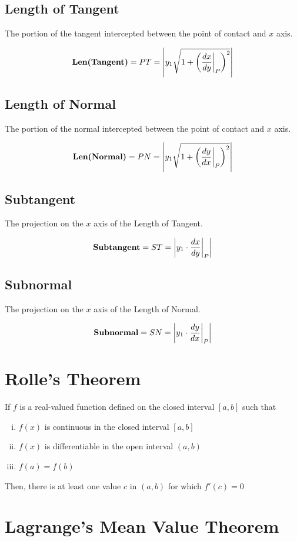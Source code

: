 \documentclass{article}
\begin{document}
\subsection{Length of Tangent}
The portion of the tangent intercepted between the point of contact and $x$ axis.

$$\textbf{Len(Tangent)}=PT=\abs{y_{1}\displaystyle\sqrt{1+\left(\dv{x}{y}\biggr\rvert_{P}\right)^2}}$$

\subsection{Length of Normal}
The portion of the normal intercepted between the point of contact and $x$ axis.

$$\textbf{Len(Normal)}=PN=\abs{y_{1}\displaystyle\sqrt{1+\left(\dv{y}{x} \biggr\rvert_{P}\right)^2}}$$

\subsection{Subtangent}
The projection on the $x$ axis of the Length of Tangent.

$$\textbf{Subtangent}=ST=\abs{y_{1}\cdot \dv{x}{y} \biggr\rvert_{P}}$$

\subsection{Subnormal}
The projection on the $x$ axis of the Length of Normal.

$$\textbf{Subnormal}=SN=\abs{y_{1}\cdot \dv{y}{x} \biggr\rvert_{P}}$$

\section{Rolle's Theorem}
If $f$ is a real-valued function defined on the closed interval $[a,b]$ such that \begin{enumerate}[i.]
    \item $f(x)$ is continuous in the closed interval $[a,b]$
    \item $f(x)$ is differentiable in the open interval $(a,b)$
    \item $f(a)=f(b)$
\end{enumerate} Then, there is at least one value $c$ in $(a,b)$ for which $f'(c)=0$ 

\section{Lagrange's Mean Value Theorem}
\end{document}
